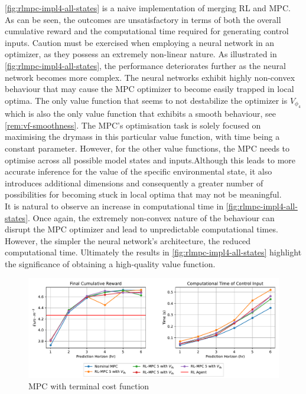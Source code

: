 \autoref{fig:rlmpc-impl4-all-states} is a naive implementation of merging RL and MPC. As can be seen, the outcomes are unsatisfactory in terms of both the overall cumulative reward and the computational time required for generating control inputs. Caution must be exercised when employing a neural network in an optimizer, as they possess an extremely non-linear nature. As illustrated in \autoref{fig:rlmpc-impl4-all-states}, the performance deteriorates further as the neural network becomes more complex. The neural networks exhibit highly non-convex behaviour that may cause the MPC optimizer to become easily trapped in local optima. The only value function that seems to not destabilize the optimizer is ${V}_{\phi_4}$ which is also the only value function that exhibits a smooth behaviour, see \cref{rem:vf-smoothness}. The MPC's optimisation task is solely focused on maximising the drymass in this particular value function, with time being a constant parameter. However, for the other value functions, the MPC needs to optimise across all possible model states and inputs.Although this leads to more accurate inference for the value of the specific environmental state, it also introduces additional dimensions and consequently a greater number of possibilities for becoming stuck in local optima that may not be meaningful.\\
It is natural to observe an increase in computational time in \autoref{fig:rlmpc-impl4-all-states}. Once again, the extremely non-convex nature of the behaviour can disrupt the MPC optimizer and lead to unpredictable computational times. However, the simpler the neural network's architecture, the reduced computational time. Ultimately the results in \autoref{fig:rlmpc-impl4-all-states} highlight the significance of obtaining a high-quality value function.

\begin{figure}[H]
	\centering
	\includegraphics[width=\textwidth]{figures/rl_mpc_impl_4_1.pdf}
	\caption{MPC with terminal cost function}
	\label{fig:rlmpc-impl4-only-drymass}
\end{figure}

